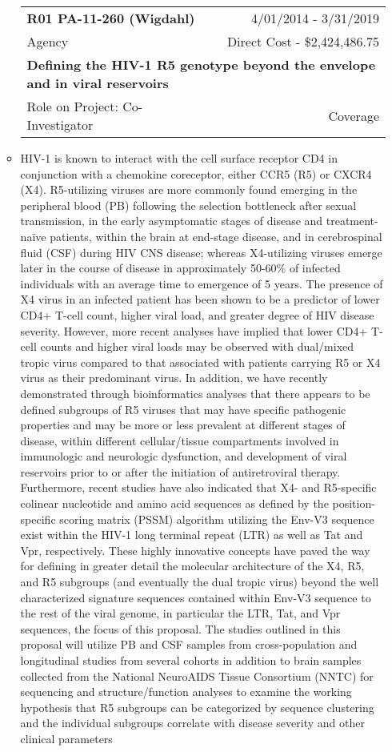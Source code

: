 \documentclass[a4paper,11pt]{article}
\makeatletter
\newenvironment{fullwidth}
    {\par
     \setlength{\@totalleftmargin}{0pt}%
     \setlength{\linewidth}{\hsize}%
     \list{}{\setlength{\leftmargin}{0pt}}
     \item\relax}
    {\endlist}
\makeatother
\begin{document}
\begin{enumerate}
\begin{itemize}
  \begin{longtable}{lr}
    \textbf{R01 PA-11-260 (Wigdahl)} & 4/01/2014 - 3/31/2019 \\
    Agency & Direct Cost - \$2,424,486.75 \\
    \multicolumn{2}{p{0.973\textwidth}}{\bfseries Defining the HIV-1 R5 genotype beyond the envelope and in viral reservoirs} \\
    Role on Project:  Co-Investigator & Coverage \\
    \end{longtable}
    \begin{fullwidth}
     HIV-1 is known to interact with the cell surface receptor CD4 in conjunction with a chemokine coreceptor, either CCR5 (R5) or CXCR4 (X4). R5-utilizing viruses are more commonly found emerging in the peripheral blood (PB) following the selection bottleneck after sexual transmission, in the early asymptomatic stages of disease and treatment-naïve patients, within the brain at end-stage disease, and in cerebrospinal fluid (CSF) during HIV CNS disease; whereas X4-utilizing viruses emerge later in the course of disease in approximately 50-60\% of infected individuals with an average time to emergence of 5 years. The presence of X4 virus in an infected patient has been shown to be a predictor of lower CD4+ T-cell count, higher viral load, and greater degree of HIV disease severity. However, more recent analyses have implied that lower CD4+ T-cell counts and higher viral loads may be observed with dual/mixed tropic virus compared to that associated with patients carrying R5 or X4 virus as their predominant virus. In addition, we have recently demonstrated through bioinformatics analyses that there appears to be defined subgroups of R5 viruses that may have specific pathogenic properties and may be more or less prevalent at different stages of disease, within different cellular/tissue compartments involved in immunologic and neurologic dysfunction, and development of viral reservoirs prior to or after the initiation of antiretroviral therapy.  Furthermore, recent studies have also indicated that X4- and R5-specific colinear nucleotide and amino acid sequences as defined by the position-specific scoring matrix (PSSM) algorithm utilizing the Env-V3 sequence exist within the HIV-1 long terminal repeat (LTR) as well as Tat and Vpr, respectively. These highly innovative concepts have paved the way for defining in greater detail the molecular architecture of the X4, R5, and R5 subgroups (and eventually the dual tropic virus) beyond the well characterized signature sequences contained within Env-V3 sequence to the rest of the viral genome, in particular the LTR, Tat, and Vpr sequences, the focus of this proposal. The studies outlined in this proposal will utilize PB and CSF samples from cross-population and longitudinal studies from several cohorts in addition to brain samples collected from the National NeuroAIDS Tissue Consortium (NNTC) for sequencing and structure/function analyses to examine the working hypothesis that R5 subgroups can be categorized by sequence clustering and the individual subgroups correlate with disease severity and other clinical parameters 
\end{fullwidth}
\end{itemize}
\end{enumerate}
\end{document}
